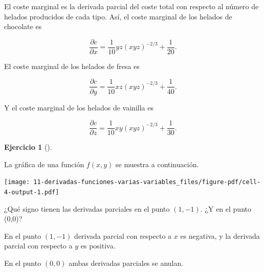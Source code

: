 \documentclass[
  a4paper,
]{scrreport}
\theoremstyle{definition}
\newtheorem{exercise}{Ejercicio}[chapter]
\theoremstyle{remark}
\begin{document}
\begin{tcolorbox}[enhanced jigsaw, toprule=.15mm, bottomrule=.15mm, coltitle=black, toptitle=1mm, breakable, left=2mm, arc=.35mm, title=\textcolor{quarto-callout-tip-color}{\faLightbulb}\hspace{0.5em}{Solución}, titlerule=0mm, colback=white, colbacktitle=quarto-callout-tip-color!10!white, colframe=quarto-callout-tip-color-frame, bottomtitle=1mm, rightrule=.15mm, leftrule=.75mm, opacitybacktitle=0.6, opacityback=0]

El coste marginal es la derivada parcial del coste total con respecto al
número de helados producidos de cada tipo. Así, el coste marginal de los
helados de chocolate es

\[
\frac{\partial c}{\partial x} = \frac{1}{10}yz(xyz)^{-2/3} + \frac{1}{20}.
\]

El coste marginal de los helados de fresa es

\[
\frac{\partial c}{\partial y} = \frac{1}{10}xz(xyz)^{-2/3} + \frac{1}{40}.
\]

Y el coste marginal de los helados de vainilla es

\[
\frac{\partial c}{\partial z} = \frac{1}{10}xy(xyz)^{-2/3} + \frac{1}{30}.
\]

\end{tcolorbox}

\begin{exercise}[]\protect\hypertarget{exr-interpretacion-derivadas-parciales-superficie}{}\label{exr-interpretacion-derivadas-parciales-superficie}

La gráfica de una función \(f(x,y)\) se muestra a continuación.

\texttt{[image: 11-derivadas-funciones-varias-variables\_files/figure-pdf/cell-4-output-1.pdf]}

¿Qué signo tienen las derivadas parciales en el punto \((1,-1)\). ¿Y en
el punto (0,0)?

\end{exercise}

\begin{tcolorbox}[enhanced jigsaw, toprule=.15mm, bottomrule=.15mm, coltitle=black, toptitle=1mm, breakable, left=2mm, arc=.35mm, title=\textcolor{quarto-callout-tip-color}{\faLightbulb}\hspace{0.5em}{Solución}, titlerule=0mm, colback=white, colbacktitle=quarto-callout-tip-color!10!white, colframe=quarto-callout-tip-color-frame, bottomtitle=1mm, rightrule=.15mm, leftrule=.75mm, opacitybacktitle=0.6, opacityback=0]

En el punto \((1,-1)\) derivada parcial con respecto a \(x\) es
negativa, y la derivada parcial con respecto a \(y\) es positiva.

En el punto \((0,0)\) ambas derivadas parciales se anulan.

\end{tcolorbox}
\end{document}

